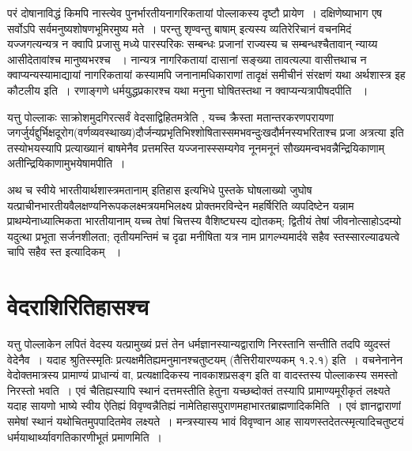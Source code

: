 परं दोषानाविद्धं किमपि नास्त्येव पुनर्भारतीयनागरिकतायां पोल्लाकस्य दृष्टौ प्रायेण~। दक्षिणेष्याभाग एष सर्वोऽपि सर्वमनुष्यशोषणभूमिरमुष्य मते~। परन्तु शृण्वन्तु बाषाम्  इत्यस्य व्यतिरेरिचानं वचनमिदं यज्जगत्यन्यत्र न क्वापि प्रजासु मध्ये पारस्परिकः सम्बन्धः प्रजानां राज्यस्य च सम्बन्धश्चैतावान् न्याय्य आसीदेतावांश्च मानुष्यभरश्च ~। नान्यत्र नागरिकतायां दासानां सङ्ख्या तावत्यल्पा वासीत्तथाच न क्वाप्यन्यस्यामाद्यायां नागरिकतायां कस्यामपि जनानामधिकाराणां  तादृक्षं समीचीनं संरक्षणं यथा अर्थशास्त्र इह कौटलीय इति~। रणाङ्गणे धर्मयुद्धप्रकारश्च यथा मनुना घोषितस्तथा न क्वाप्यन्यत्रापीषदपीति ~।

यत्तु पोल्लाकः साक्रोशमुदगिरत्सर्वं वेदसाद्विहितमत्रेति , यच्च क्रैस्ता मतान्तरकरणपरायणा जगर्जुर्यद्दुर्भिक्षदूरोग(वर्णव्यवस्थाख्य)दौर्जन्यप्रभृतिभिश्शोषितास्समभवन्दुःखदौर्मनस्यभरिताश्च प्रजा अत्रत्या इति तस्योभयस्यापि प्रत्याख्यानं बाषमेनैव प्रत्तमस्ति  यज्जनास्स्सम्यगेव नूनमनूनं सौख्यमन्वभवन्नैन्द्रियिकाणाम् अतीन्द्रियिकाणामुभयेषामपीति~।

\newpage

अथ च स्वीये भारतीयार्थशास्त्रमतानाम् इतिहास इत्यभिधे पुस्तके घोषलाख्यो जुघोष यत्प्राचीनभारतीयवैलक्षण्यनिरूपकलक्ष्मत्रयमभिलक्ष्य प्रोक्तमरविन्देन महर्षिरिति व्यपदिष्टेन  यन्नाम प्राथम्येनाध्यात्मिकता भारतीयानाम् यच्च तेषां चित्तस्य वैशिष्ट्यस्य द्योतकम्; द्वितीयं तेषां जीवनोत्साहोऽदम्यो यदुत्था प्रभूता सर्जनशीलता; तृतीयमन्तिमं च दृढा मनीषिता यत्र नाम प्रागल्भ्यमार्दवे सहैव स्तस्सारल्याढ्यत्वे चापि सहैव स्त इत्यादिकम् ~।


\section*{वेदराशिरितिहासश्च}

यत्तु पोल्लाकेन लपितं वेदस्य यत्प्रामुख्यं प्रत्तं तेन धर्मज्ञानस्यान्यद्वाराणि निरस्तानि सन्तीति तदपि व्युदस्तं वेदेनैव~। यदाह श्रुतिस्स्मृतिः प्रत्यक्षमैतिह्यमनुमानश्चतुष्टयम् (तैत्तिरीयारण्यकम् १.२.१) इति~। वचनेनानेन वेदोक्तमात्रस्य प्रामाण्यं प्राधान्यं वा, प्रत्यक्षादिकस्य नावकाशप्रसङ्ग इति वा वादस्तस्य पोल्लाकस्य समस्तो निरस्तो भवति~। एवं चैतिह्यस्यापि स्थानं दत्तमस्तीति हेतुना यच्छब्दोक्तं तस्यापि प्रामाण्यमूरीकृतं लक्ष्यते यदाह सायणो भाष्ये स्वीय ऐतिह्यं विवृण्वन्नैतिह्यं नामेतिहासपुराणमहाभारतब्राह्मणादिकमिति~। एवं ज्ञानद्वाराणां समेषां स्थानं यथोचितमुपपादितमेव लक्ष्यते~। मन्त्रस्यास्य भावं विवृण्वान आह सायणस्तदेतत्स्मृत्यादिचतुष्टयं धर्मयाथार्थ्यावगतिकारणीभूतं प्रमाणमिति~।


